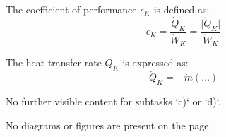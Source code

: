 The coefficient of performance \( \epsilon_K \) is defined as:  
\[
\epsilon_K = \frac{\dot{Q}_K}{\dot{W}_K} = \frac{\lvert \dot{Q}_K \rvert}{\dot{W}_K}
\]  

The heat transfer rate \( \dot{Q}_K \) is expressed as:  
\[
\dot{Q}_K = -\dot{m} \left( \ldots \right)
\]  

No further visible content for subtasks `c)` or `d)`.  

No diagrams or figures are present on the page.